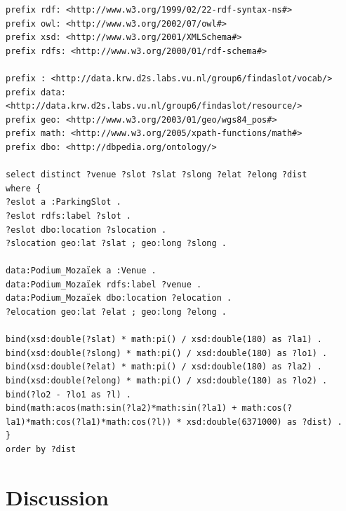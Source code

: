 \documentclass[runningheads,a4paper]{../../StyleFiles/llncs}
\begin{document}
\begin{lstlisting}[captionpos=b, caption=SPARQL query, label=lst:sparql,
basicstyle=\ttfamily,frame=bt]
prefix rdf: <http://www.w3.org/1999/02/22-rdf-syntax-ns#>
prefix owl: <http://www.w3.org/2002/07/owl#>
prefix xsd: <http://www.w3.org/2001/XMLSchema#>
prefix rdfs: <http://www.w3.org/2000/01/rdf-schema#>

prefix : <http://data.krw.d2s.labs.vu.nl/group6/findaslot/vocab/>
prefix data: <http://data.krw.d2s.labs.vu.nl/group6/findaslot/resource/>
prefix geo: <http://www.w3.org/2003/01/geo/wgs84_pos#>
prefix math: <http://www.w3.org/2005/xpath-functions/math#>
prefix dbo: <http://dbpedia.org/ontology/>

select distinct ?venue ?slot ?slat ?slong ?elat ?elong ?dist
where {
?eslot a :ParkingSlot .
?eslot rdfs:label ?slot .
?eslot dbo:location ?slocation .
?slocation geo:lat ?slat ; geo:long ?slong .

data:Podium_Mozaïek a :Venue .
data:Podium_Mozaïek rdfs:label ?venue .
data:Podium_Mozaïek dbo:location ?elocation .
?elocation geo:lat ?elat ; geo:long ?elong .

bind(xsd:double(?slat) * math:pi() / xsd:double(180) as ?la1) .
bind(xsd:double(?slong) * math:pi() / xsd:double(180) as ?lo1) .
bind(xsd:double(?elat) * math:pi() / xsd:double(180) as ?la2) .
bind(xsd:double(?elong) * math:pi() / xsd:double(180) as ?lo2) .
bind(?lo2 - ?lo1 as ?l) .
bind(math:acos(math:sin(?la2)*math:sin(?la1) + math:cos(?la1)*math:cos(?la1)*math:cos(?l)) * xsd:double(6371000) as ?dist) .
}
order by ?dist

\end{lstlisting}




\section{Discussion}



\end{document}
